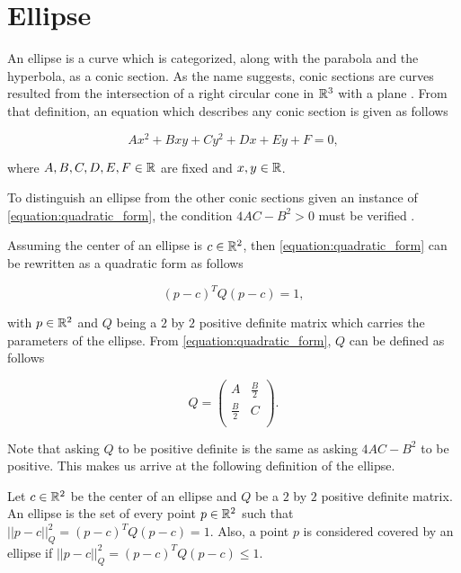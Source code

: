 \section{Ellipse}

An ellipse is a curve which is categorized, along with the parabola and the hyperbola, as a conic section. As the name suggests, conic sections are curves resulted from the intersection of a right circular cone in $\mathbb{R}^3$ with a plane \cite{brannan:geometry}. From that definition, an equation which describes any conic section is given as follows

\begin{equation}\label{equation:quadratic_form}
Ax^2 + Bxy + Cy^2 + Dx + Ey + F = 0,
\end{equation}

\noindent where $A,B,C,D,E,F \in \mathbb{R}$ are fixed and $x, y \in \mathbb{R}$.

To distinguish an ellipse from the other conic sections given an instance of \autoref{equation:quadratic_form}, the condition $4AC - B^2>0$ must be verified \cite{ayoub}.

Assuming the center of an ellipse is $c \in \mathbb{R}^2$, then \autoref{equation:quadratic_form} can be rewritten as a quadratic form as follows

\begin{equation}
(p-c)^{T}Q(p-c) = 1,
\end{equation}

\noindent with $p \in \mathbb{R}^2$ and $Q$ being a $2$ by $2$ positive definite matrix which carries the parameters of the ellipse. From \autoref{equation:quadratic_form}, $Q$ can be defined as follows

\[
Q=
\left( {\begin{array}{cc}
	A & \frac{B}{2} \\
	\frac{B}{2} & C \\
	\end{array} } \right).
\]

Note that asking $Q$ to be positive definite is the same as asking $4AC-B^2$ to be positive. This makes us arrive at the following definition of the ellipse.

\begin{definicao}\label{def:ellipse}
    Let $c\in \mathbb{R}^2$ be the center of an ellipse and $Q$ be a $2$ by $2$ positive definite matrix. An ellipse is the set of every point $p \in \mathbb{R}^2$ such that $||p-c||_{Q}^2 = (p-c)^{T}Q(p-c) = 1$. Also, a point $p$ is considered covered by an ellipse if $||p-c||_{Q}^2 = (p-c)^{T}Q(p-c) \le 1$.
\end{definicao}

